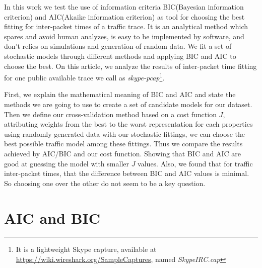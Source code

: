 In this work we test the use of information criteria BIC(Bayesian information criterion) and AIC(Akaike information criterion) as tool for choosing the best fitting for inter-packet times of a traffic trace. It is an analytical method which spares and avoid human analyzes, is easy to be implemented by software, and don't relies on simulations and generation of random data. We fit a set of stochastic models through different methods and applying BIC and AIC to choose the best.  On this article, we analyze the results of inter-packet time fitting for one public available trace we call as \textit{skype-pcap}\footnote{It is a lightweight Skype capture, available at \href{https://wiki.wireshark.org/SampleCaptures}{https://wiki.wireshark.org/SampleCaptures}, named \textit{SkypeIRC.cap} }.


First, we explain the mathematical meaning of BIC and AIC and state the methods we are going to use to create a set of candidate models for our dataset. Then we define our cross-validation method based on a cost function $J$, attributing weights from the best to the worst representation for each properties using randomly generated data with our stochastic fittings, we can choose the best possible traffic model among these fittings. Thus we compare the results achieved by AIC/BIC and our cost function. Showing that BIC and AIC are good at guessing the model with smaller $J$ values. Also, we found that for traffic inter-packet times, that the difference between BIC and AIC values is minimal. So choosing one over the other do not seem to be a key question.  


\section{AIC and BIC}\label{sec:aic-bic}

